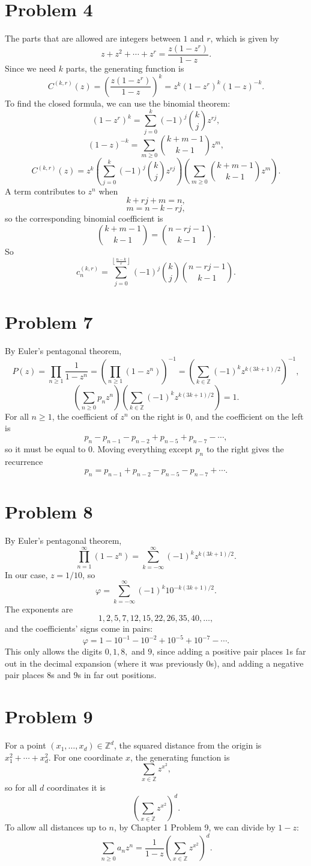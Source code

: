 \documentclass{article}
\newcommand{\Z}{\mathbb{Z}}
\newcommand{\bigp}[1]{\left(#1\right)}
\begin{document}
\section*{Problem 4}
The parts that are allowed are integers between $1$ and $r$, which is given by
$$z + z^2 + \cdots + z^r = \frac{z(1 - z^r)}{1 - z}.$$
Since we need $k$ parts, the generating function is
$$C^{(k, r)}(z) = \bigp{\frac{z(1 - z^r)}{1 - z}}^k = z^k(1 - z^r)^k(1 - z)^{-k}.$$
To find the closed formula, we can use the binomial theorem:
$$(1 - z^r)^k = \sum_{j = 0}^k (-1)^j \binom{k}{j}z^{rj},$$
$$(1 - z)^{-k} = \sum_{m \ge 0}\binom{k + m - 1}{k - 1}z^m,$$
$$C^{(k, r)}(z) = z^k\bigp{\sum_{j = 0}^k (-1)^j \binom{k}{j}z^{rj}}\bigp{\sum_{m \ge 0}\binom{k + m - 1}{k - 1}z^m}.$$
A term contributes to $z^n$ when
$$k + rj + m = n,$$
$$m = n - k - rj,$$
so the corresponding binomial coefficient is
$$\binom{k + m - 1}{k - 1} = \binom{n - rj - 1}{k - 1}.$$
So
$$c_n^{(k, r)} = \sum_{j = 0}^{\left\lfloor \frac{n - k}{r}\right\rfloor} (-1)^j \binom{k}{j}\binom{n - rj  -1}{k - 1}.$$

\section*{Problem 7}
By Euler's pentagonal theorem,
$$P(z) = \prod_{n \ge 1} \frac{1}{1 - z^n} = \bigp{\prod_{n \ge 1} (1 - z^n)}^{-1} = \bigp{\sum_{k \in \Z}(-1)^kz^{k(3k + 1)/2}}^{-1},$$
$$\bigp{\sum_{n \ge 0} p_n z^n} \bigp{\sum_{k \in \Z}(-1)^kz^{k(3k + 1)/2}} = 1.$$
For all $n \ge 1$, the coefficient of $z^n$ on the right is $0$, and the coefficient on the left is
$$p_n - p_{n - 1} - p_{n - 2} + p_{n - 5} + p_{n - 7} - \cdots,$$
so it must be equal to $0$. Moving everything except $p_n$ to the right gives the recurrence
$$p_n = p_{n - 1} + p_{n - 2} - p_{n - 5} - p_{n - 7} + \cdots.$$

\section*{Problem 8}
By Euler's pentagonal theorem,
$$\prod_{n = 1}^\infty(1 - z^n) = \sum_{k = -\infty}^\infty (-1)^kz^{k(3k + 1)/2}.$$
In our case, $z = 1/10$, so
$$\varphi = \sum_{k = -\infty}^\infty (-1)^k10^{-k(3k + 1)/2}.$$
The exponents are
$$1, 2, 5, 7, 12, 15, 22, 26, 35, 40, \ldots,$$
and the coefficients' signs come in pairs:
$$\varphi = 1 - 10^{-1} - 10^{-2} + 10^{-5} + 10^{-7} - \cdots.$$
This only allows the digits $0, 1, 8,$ and $9$, since adding a positive pair places $1$s far out in the decimal expansion (where it was previously $0$s), and adding a negative pair places $8$s and $9$s in far out positions.

\section*{Problem 9}
For a point $(x_1, \ldots, x_d) \in \Z^d$, the squared distance from the origin is $x_1^2 + \cdots + x_d^2$. For one coordinate $x$, the generating function is
$$\sum_{x \in \Z}z^{x^2},$$
so for all $d$ coordinates it is
$$\bigp{\sum_{x \in \Z}z^{x^2}}^d.$$
To allow all distances up to $n$, by Chapter 1 Problem 9, we can divide by $1 - z$:
$$\sum_{n \ge 0} a_nz^n = \frac{1}{1 - z}\bigp{\sum_{x \in \Z}z^{x^2}}^d.$$
\end{document}
